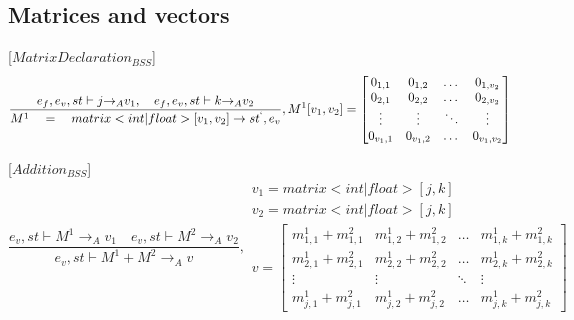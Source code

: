 \subsection*{Matrices and vectors} 
[${MatrixDeclaration}_{BSS}$]
\begin{equation}
	\frac { { e }_{ f },{ e }_{ v },st\vdash j{ \rightarrow  }_{ A }{ v }_{ 1 },\quad { e }_{ f },{ e }_{ v },st\vdash k{ \rightarrow  }_{ A }{ v }_{ 2 } }{ { M }^{ 1 }\quad =\quad matrix<int|float>[{ v }_{ 1 },{ v }_{ 2 }]\rightarrow { st }^{ ` },{ e }_{ v } } ,{ M }^{ 1 }[{ v }_{ 1 },{ v }_{ 2 }]=\begin{bmatrix} { { 0 }_{ 1,1 } } & 0_{ 1,2 } & \dots  & { 0 }_{ { 1,{ v }_{ 2 } } } \\ 0_{ 2,1 } & 0_{ 2,2 } & \dots  & 0_{ 2,v_{ 2 } } \\ \vdots  & \vdots  & \ddots  & \vdots  \\ { 0 }_{ { v }_{ 1 },1 } & 0_{ v_{ 1 },2 } & \dots  & { 0 }_{ { v }_{ 1 },{ v }_{ 2 } } \end{bmatrix}
\end{equation}

[${Addition}_{BSS}$]
\begin{equation}
	\frac { { e }_{ v },st\vdash { M }^{ 1 }{ \rightarrow  }_{ A }{ v }_{ 1 }\quad { e }_{ v },st\vdash { M }^{ 2 }{ \rightarrow  }_{ A }{ v }_{ 2 } }{ { e }_{ v },st\vdash { M }^{ 1 }+{ M }^{ 2 }{ \rightarrow  }_{ A }{ v } } ,\begin{matrix} { v }_{ 1 }=matrix<int|float>[j,k] \\ { v }_{ 2 }=matrix<int|float>[j,k] \\ v=\begin{bmatrix} { { m }_{ 1,1 }^{ 1 } } +{ { m }_{ 1,1 }^{ 2 } } & { { m }_{ 1,2 }^{ 1 } } + { { m }_{ 1,2 }^{ 2 } } & \dots  & { m }_{ 1,k }^{ 1 }+{ { m }_{ 1,k }^{ 2} } \\
	{ { m }_{ 2,1 }^{ 1 } } + { { m }_{ 2,1 }^{ 2 } } &  { { m }_{ 2,2 }^{ 1 } } +{ { m }_{ 2,2 }^{ 2 } } & \dots & { { m }_{ 2,k }^{ 1 } } + { { m }_{ 2,k }^{ 2 } }
	\\ \vdots  & \vdots & \ddots  & \vdots \\
 	{ m }_{ j,1 }^{ 1 } +{ { m }_{ j,1 }^{ 2 } } & { { m }_{ j,2 }^{ 1 } } +{ { m }_{ j,2 }^{ 2 } }  & \dots & { m }_{ j,k }^{ 1 }+{ { m }_{ j,k }^{ 2 } } \end{bmatrix}
 \end{matrix}
\end{equation}


